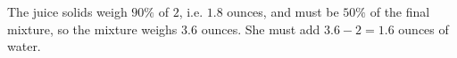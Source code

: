The juice solids weigh $90\%$ of $2$, i.e. $1.8$ ounces, and must be $50\%$ of the final mixture, so the mixture weighs $3.6$ ounces. She must add $3.6-2=\boxed{1.6}$ ounces of water.
